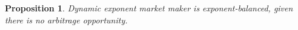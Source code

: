 \documentclass[12pt,a4paper]{article}
\newtheorem{proposition}[corollary]{Proposition}
\begin{document}

\begin{proposition}\label{p:balance}
Dynamic exponent market maker is exponent-balanced, given there is no arbitrage opportunity.
\end{proposition}
\end{document}
